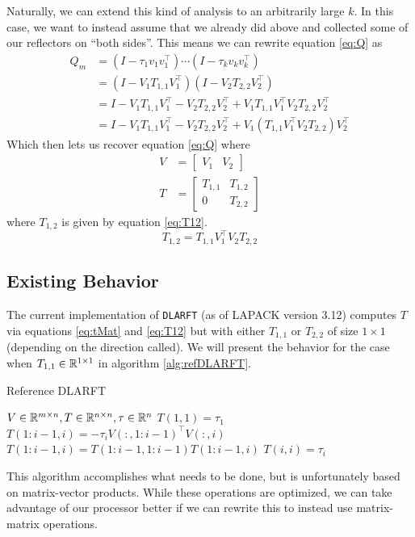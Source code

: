 \documentclass[12pt]{article}
\begin{document}
    Naturally, we can extend this kind of analysis to an arbitrarily large $k$. In this case, we want to
    instead assume that we already did above and collected some of our reflectors on ``both sides''. This means
    we can rewrite equation \ref{eq:Q} as
    \begin{align*}
        Q_m &= \left(I-\tau_1v_1v_1^\top\right)\cdots\left(I-\tau_kv_kv_k^\top\right) \\
            &= \left(I - V_1T_{1,1}V_1^\top\right)\left(I - V_2T_{2,2}V_2^\top\right) \\
            &= I - V_1T_{1,1}V_1^\top - V_2T_{2,2}V_2^\top + V_1T_{1,1}V_1^\top V_2T_{2,2}V_2^\top \\
            &= I - V_1T_{1,1}V_1^\top - V_2T_{2,2}V_2^\top + V_1\left(T_{1,1}V_1^\top V_2T_{2,2}\right)V_2^\top
    \end{align*}
    Which then lets us recover equation \ref{eq:Q} where
    \begin{align}
        V &= \begin{bmatrix} V_1 & V_2 \end{bmatrix} \label{eq:vMat} \\
        T &= \begin{bmatrix} T_{1,1} & T_{1,2} \\
        0 & T_{2,2}\end{bmatrix} \label{eq:tMat}
    \end{align}
    where $T_{1,2}$ is given by equation \ref{eq:T12}.
    \begin{equation}\label{eq:T12}
        T_{1,2} = T_{1,1}V_1^\top V_2T_{2,2}
    \end{equation}
    \subsection{Existing Behavior}
    The current implementation of \verb|DLARFT| (as of LAPACK version 3.12) computes $T$ via equations 
    \ref{eq:tMat} and \ref{eq:T12} but with either $T_{1,1}$ or $T_{2,2}$ of size $1\times 1$ (depending on the direction called). We will present the behavior for the case when $T_{1,1}\in\mathbb{R}^{1\times 1}$ in algorithm \ref{alg:refDLARFT}.

    \begin{algorithm}
        \caption{Reference DLARFT}\label{alg:refDLARFT}
        \begin{algorithmic}[1]
            \REQUIRE $V\in\mathbb{R}^{m\times n}, T\in\mathbb{R}^{n\times n}, \tau\in\mathbb{R}^{n}$ \hfill{}
            \STATE $T(1,1) = \tau_1$
                \STATE $T(1:i-1,i) = -\tau_iV(:,1:i-1)^\top V(:,i)$
                \STATE $T(1:i-1,i) = T(1:i-1,1:i-1)T(1:i-1,i)$
                \STATE $T(i,i) = \tau_i$
            \ENDFOR
        \end{algorithmic}
    \end{algorithm}
    This algorithm accomplishes what needs to be done, but is unfortunately based on matrix-vector products.
    While these operations are optimized, we can take advantage of our processor better if we can rewrite this
    to instead use matrix-matrix operations.
\end{document}
